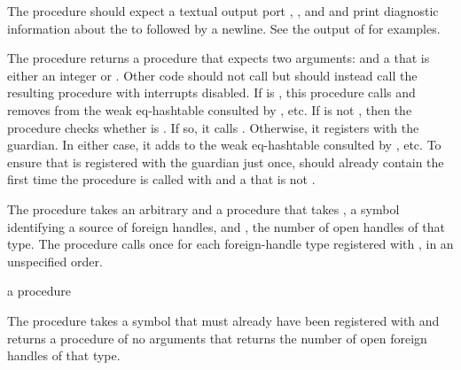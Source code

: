 The  procedure should expect a textual output port ,
, and  and print diagnostic information about the
 to  followed by a newline.
See the output of  for examples.

The  procedure returns a procedure
that expects two arguments:  and a  that is
either an integer or .
Other code should not call  but should instead
call the resulting procedure with interrupts disabled.
If  is , this procedure calls
and removes  from the weak eq-hashtable consulted by
, etc.
If  is not , then
the procedure checks whether 
is .
If so, it calls .
Otherwise, it registers  with the guardian.
In either case, it adds  to the weak eq-hashtable
consulted by , etc.
To ensure that  is registered with the guardian just once,
 should already contain  the first time
the procedure is called with  and a  that
is not .

\begin{procedure}
\end{procedure}
\returns{} 

The  procedure takes an arbitrary  and a
procedure  that takes , a symbol 
identifying a source of foreign handles, and , the number of
open handles of that type.
The  procedure calls  once for
each foreign-handle type registered with ,
in an unspecified order.

\begin{procedure}
\end{procedure}
\returns{} a procedure

The  procedure takes a symbol  that
must already have been registered with 
and returns a procedure of no arguments that returns the number of open foreign
handles of that type.

